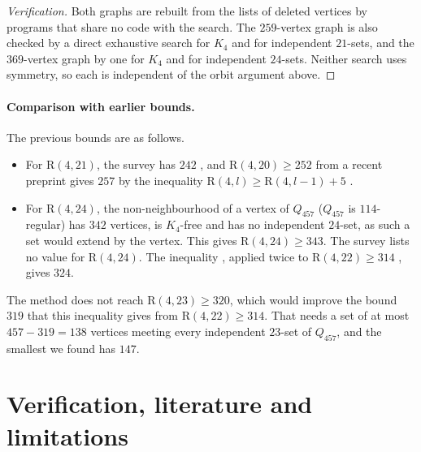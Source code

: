 \documentclass[11pt]{article}
\theoremstyle{spacedplain}
\theoremstyle{spaceddef}
\theoremstyle{spacedremark}
\newcommand{\R}{\mathrm{R}}
\begin{document}
\begin{proof}[Verification]
Both graphs are rebuilt from the lists of deleted vertices by programs that share no code with the search.
The $259$-vertex graph is also checked by a direct exhaustive search for $K_4$ and for independent $21$-sets, and the $369$-vertex graph by one for $K_4$ and for independent $24$-sets.
Neither search uses symmetry, so each is independent of the orbit argument above.
\end{proof}

\paragraph{Comparison with earlier bounds.}
The previous bounds are as follows.
\begin{itemize}
\item For $\R(4,21)$, the survey has $242$ \cite{SLZL}, and $\R(4,20)\ge 252$ from a recent preprint \cite{Yu26} gives $257$ by the inequality $\R(4,l)\ge\R(4,l-1)+5$ \cite[2.3(e)]{Rad26}.
\item For $\R(4,24)$, the non-neighbourhood of a vertex of $Q_{457}$ ($Q_{457}$ is $114$-regular) has $342$ vertices, is $K_4$-free and has no independent $24$-set, as such a set would extend by the vertex.
This gives $\R(4,24)\ge 343$.
The survey lists no value for $\R(4,24)$.
The inequality \cite[2.3(e)]{Rad26}, applied twice to $\R(4,22)\ge 314$ \cite{LinCa}, gives $324$.
\end{itemize}

The method does not reach $\R(4,23)\ge 320$, which would improve the bound $319$ that this inequality gives from $\R(4,22)\ge 314$.
That needs a set of at most $457-319=138$ vertices meeting every independent $23$-set of $Q_{457}$, and the smallest we found has $147$.

\section{Verification, literature and limitations}\label{sec:verify}
\end{document}
